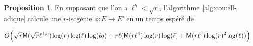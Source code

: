 \documentclass[10pt,a4paper]{book}
\theoremstyle{plain}
\theoremstyle{definition}
\theoremstyle{definition}
\theoremstyle{definition}
\newtheorem{prop}[thm]{Proposition}
\theoremstyle{definition}
\theoremstyle{remark}
\theoremstyle{remark}
\theoremstyle{definition}
\begin{document}
\begin{prop}
  \label{pro:full-complexity}
  En supposant que l'on a $\ell^h<\sqrt{r}$, 
  l'algorithme~\ref{alg:cou:ell-adique} calcule une $r$-isogénie 
  ${\phi:E \rightarrow E'}$ en un temps espéré de 
 
 \[
O\Bigl(\sqrt{r}\mathsf{M}(\sqrt{r}\ell^{1,5})\log(r)\log(\ell)\log(\ell q) + r \ell ( \mathsf{M}(r \ell^4) \log(r) \log(\ell) + \mathsf{M}(r \ell^3) \log(r)^2 \log(\ell) )  \Bigr)
 \]
\end{prop}
\end{document}
